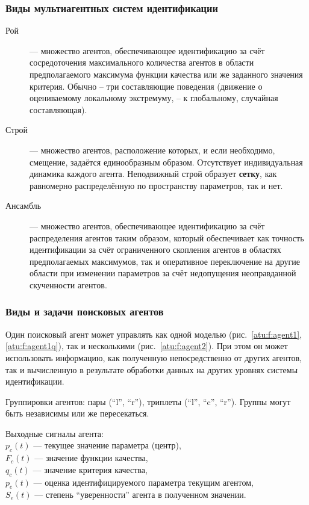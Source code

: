 \documentclass[10pt,utf8]{beamer}
\begin{document}
\begin{frame}
  \frametitle{Виды мультиагентных систем идентификации}

  \begin{description}
    \item[Рой]
      --- множество агентов, обеспечивающее идентификацию за счёт
      сосредоточения максимального количества агентов
      в области предполагаемого максимума функции качества или же
      заданного значения критерия.
      Обычно -- три составляющие поведения
      (движение о оцениваемому локальному экстремуму, -- к глобальному, случайная составляющая).

    \item[Строй]
      --- множество агентов, расположение которых,
      и если необходимо, смещение, задаётся
      единообразным образом.
      Отсутствует индивидуальная динамика каждого агента.
      Неподвижный строй образует \textbf{сетку},
      как равномерно распределённую по пространству параметров,
      так и нет.

    \item[Ансамбль]
      --- множество агентов, обеспечивающее идентификацию за счёт
      распределения агентов таким образом, который обеспечивает как
      точность идентификации за счёт ограниченного скопления агентов
      в областях предполагаемых максимумов, так и оперативное переключение
      на другие области при изменении параметров за счёт недопущения
      неоправданной скученности агентов.
   \end{description}

\end{frame}




\begin{frame}
  \frametitle{Виды и задачи поисковых агентов}

  Один поисковый агент может управлять как одной моделью (рис.~\ref{atu:f:agent1}, \ref{atu:f:agent1q}),
  так и несколькими (рис.~\ref{atu:f:agent2}).
  При этом он может использовать информацию,
  как полученную непосредственно от других агентов,
  так и вычисленную в результате обработки данных на других уровнях системы идентификации.

  Группировки агентов: пары (``l'', ``r''), триплеты (``l'', ``c'', ``r'').
  Группы могут быть независимы или же пересекаться.


  Выходные сигналы агента: \\
  $p_c(t)$ --- текущее значение параметра (центр), \\
  $F_c(t)$ --- значение функции качества, \\
  $q_c(t)$ --- значение критерия качества, \\
  $p_e(t)$ --- оценка идентифицируемого параметра текущим агентом, \\
  $S_e(t)$ --- степень ``уверенности'' агента в полученном значении.

\end{frame}
\end{document}
